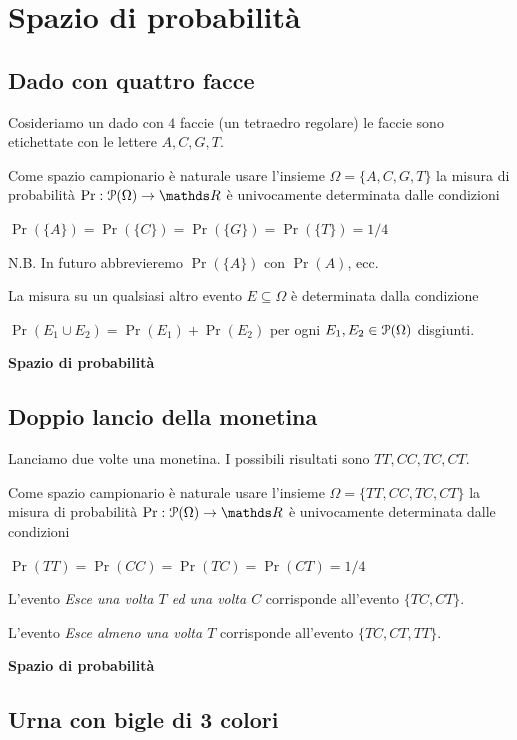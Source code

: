 \documentclass[12pt,openany]{book}
\def\RR{\mathds R}
\def\P{\EuScript P}
\theoremstyle{mio}
\theoremstyle{liscio}
\begin{document}
\hfill{}\clearpage\section{Spazio di probabilità}

\subsection{Dado con quattro facce}
\label{tetraedro}

Cosideriamo un dado con $4$ faccie (un tetraedro regolare) le faccie sono etichettate con le lettere $A, C, G, T$. 

Come spazio campionario è naturale usare l'insieme $\Omega=\{A,C,G,T\}$ la misura di probabilità $\Pr:\P(\Omega)\to\RR$ è univocamente determinata dalle condizioni

$\Pr(\{A\})=\Pr(\{C\})=\Pr(\{G\})=\Pr(\{T\})=1/4$

N.B. In futuro abbrevieremo $\Pr(\{A\})$ con $\Pr(A)$, ecc.

La misura su un qualsiasi altro evento $E\subseteq\Omega$ è determinata dalla condizione 

$\Pr(E_1\cup E_2)=\Pr(E_1)+\Pr(E_2)$ per ogni $E_1,E_2\in\P(\Omega)$ disgiunti.



\hfill{}\clearpage\hfill\textbf{Spazio di probabilità}
\subsection{Doppio lancio della monetina}
\label{doppo_lancio_moneta}

Lanciamo due volte una monetina. I possibili risultati sono $TT, CC, TC, CT$. 

Come spazio campionario è naturale usare l'insieme $\Omega=\{TT, CC, TC, CT\}$ la misura di probabilità $\Pr:\P(\Omega)\to\RR$ è univocamente determinata dalle condizioni

$\Pr(TT)=\Pr(CC)=\Pr(TC)=\Pr(CT)=1/4$

L'evento \textit{Esce una volta $T$ ed una volta $C$\/} corrisponde all'evento $\{TC, CT\}$.

L'evento \textit{Esce almeno una volta $T$\/} corrisponde all'evento $\{TC, CT, TT\}$.



\hfill{}\clearpage\hfill\textbf{Spazio di probabilità}
\subsection{Urna con bigle di 3 colori}
\label{urna_3_colori}
\end{document}
